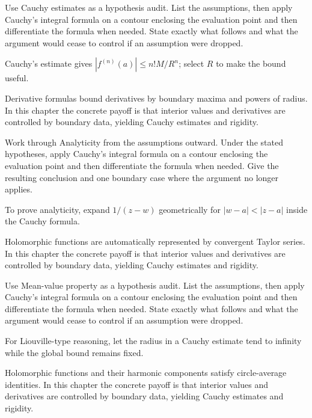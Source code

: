 \begin{exercise}\label{exr:iv06-04}
Use Cauchy estimates as a hypothesis audit. List the assumptions, then apply Cauchy's integral formula on a contour enclosing the evaluation point and then differentiate the formula when needed. State exactly what follows and what the argument would cease to control if an assumption were dropped.
\end{exercise}
\begin{hint}
Cauchy's estimate gives \(|f^{(n)}(a)|\le n!M/R^n\); select \(R\) to make the bound useful.
\end{hint}
\begin{solution}
Derivative formulas bound derivatives by boundary maxima and powers of radius. In this chapter the concrete payoff is that interior values and derivatives are controlled by boundary data, yielding Cauchy estimates and rigidity.
\end{solution}

\begin{exercise}\label{exr:iv06-05}
Work through Analyticity from the assumptions outward. Under the stated hypotheses, apply Cauchy's integral formula on a contour enclosing the evaluation point and then differentiate the formula when needed. Give the resulting conclusion and one boundary case where the argument no longer applies.
\end{exercise}
\begin{hint}
To prove analyticity, expand \(1/(z-w)\) geometrically for \(|w-a|<|z-a|\) inside the Cauchy formula.
\end{hint}
\begin{solution}
Holomorphic functions are automatically represented by convergent Taylor series. In this chapter the concrete payoff is that interior values and derivatives are controlled by boundary data, yielding Cauchy estimates and rigidity.
\end{solution}

\begin{exercise}\label{exr:iv06-06}
Use Mean-value property as a hypothesis audit. List the assumptions, then apply Cauchy's integral formula on a contour enclosing the evaluation point and then differentiate the formula when needed. State exactly what follows and what the argument would cease to control if an assumption were dropped.
\end{exercise}
\begin{hint}
For Liouville-type reasoning, let the radius in a Cauchy estimate tend to infinity while the global bound remains fixed.
\end{hint}
\begin{solution}
Holomorphic functions and their harmonic components satisfy circle-average identities. In this chapter the concrete payoff is that interior values and derivatives are controlled by boundary data, yielding Cauchy estimates and rigidity.
\end{solution}

